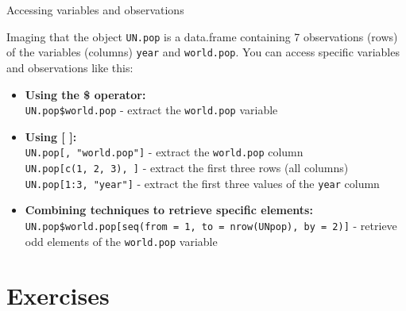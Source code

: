 \documentclass[aspectratio=169]{beamer}
\begin{document}
\begin{frame}{Accessing variables and observations}

    Imaging that the object \texttt{UN.pop} is a data.frame containing 7 observations (rows) of the variables (columns) \texttt{year} and \texttt{world.pop}. You can access specific variables and observations like this:
    \begin{itemize}
        \item \textbf{Using the \$ operator:} \\
        \texttt{UN.pop\$world.pop} - extract the \texttt{world.pop} variable
        \item \textbf{Using [ ]:} \\
        \texttt{UN.pop[, "world.pop"]} - extract the \texttt{world.pop} column \\
        \texttt{UN.pop[c(1, 2, 3), ]} - extract the first three rows (all columns) \\
        \texttt{UN.pop[1:3, "year"]} - extract the first three values of the \texttt{year} column
        \item \textbf{Combining techniques to retrieve specific elements:} \\
        \texttt{UN.pop\$world.pop[seq(from = 1, to = nrow(UNpop), by = 2)]} -  retrieve odd elements of the \texttt{world.pop} variable
    \end{itemize}
\end{frame}


\section{\Large Exercises}
\end{document}
